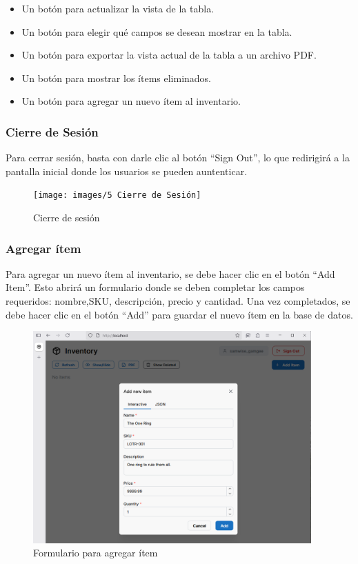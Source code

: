 \begin{itemize}
    \item Un botón para actualizar la vista de la tabla.
    \item Un botón para elegir qué campos se desean mostrar en la tabla.
    \item Un botón para exportar la vista actual de la tabla a un archivo PDF.
    \item Un botón para mostrar los ítems eliminados.
    \item Un botón para agregar un nuevo ítem al inventario.
\end{itemize}

\subsubsection{Cierre de Sesión}

Para cerrar sesión, basta con darle clic al botón “Sign Out”, lo que redirigirá a la pantalla inicial donde los usuarios se pueden auntenticar.

\begin{figure}[H]
    \centering
    \texttt{[image: images/5 Cierre de Sesión]}
    \caption{Cierre de sesión}
\end{figure}

\subsubsection{Agregar ítem}

Para agregar un nuevo ítem al inventario, se debe hacer clic en el botón “Add Item”. Esto abrirá un formulario donde se deben completar los campos requeridos: nombre,SKU, descripción, precio y cantidad. Una vez completados, se debe hacer clic en el botón “Add” para guardar el nuevo ítem en la base de datos.

\begin{figure}[H]
    \centering
    \includegraphics[width=0.95\textwidth]{images/6 Agregar}
    \caption{Formulario para agregar ítem}
\end{figure}


